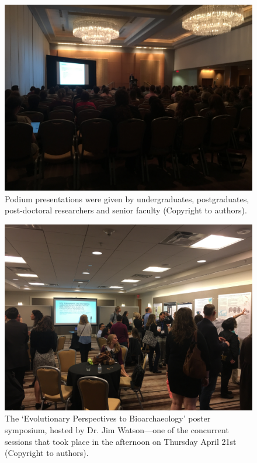 \documentclass[english]{ijsra}
\begin{document}
\begin{figure} %
		\includegraphics[width=\linewidth]{figures/Ward-Figure3}
		\caption{Podium presentations were given by undergraduates, postgraduates, post-doctoral researchers and senior faculty (Copyright to authors).}
		\centering
		\label{fig:Ward-Figure3}
	\end{figure}
	
	\begin{figure} %
		\includegraphics[width=\linewidth]{figures/Ward-Figure4}
		\caption{The ‘Evolutionary Perspectives to Bioarchaeology’ poster symposium, hosted by Dr. Jim Watson—one of the concurrent sessions that took place in the afternoon on Thursday April 21st (Copyright to authors).}
		\centering
		\label{fig:Ward-Figure4}
	\end{figure}
	
\end{document}
